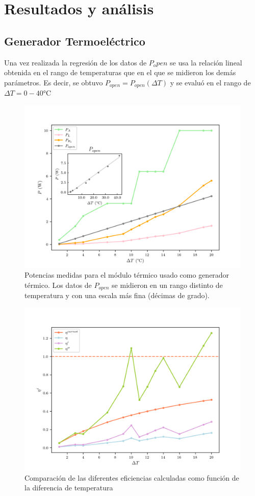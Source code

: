 \section{Resultados y análisis}

\subsection{Generador Termoeléctrico}
Una vez realizada la regresión de los datos de $P_open$ se usa la relación lineal obtenida en el rango de temperaturas que en el que se midieron los demás parámetros. Es decir, se obtuvo $P_{open} = P_{open}(\Delta T)$ y se evaluó en el rango de $\Delta T = 0 - 40 \si{\celsius}$
\begin{figure}[ht]
    \centering
    \includegraphics[width = 0.8\linewidth]{img/gen_powers.png}
    \caption{Potencias medidas para el módulo térmico usado como generador térmico. Los datos de $P_{open}$ se midieron en un rango distinto de temperatura y con una escala más fina (décimas de grado).}
    \label{fig:powers}
\end{figure}


\begin{figure}[ht]
    \centering
    \includegraphics[width = 0.8\linewidth]{img/gen_etas.png}
    \caption{Comparación de las diferentes eficiencias calculadas como función de la diferencia de temperatura}
    \label{fig:etas}
\end{figure}

